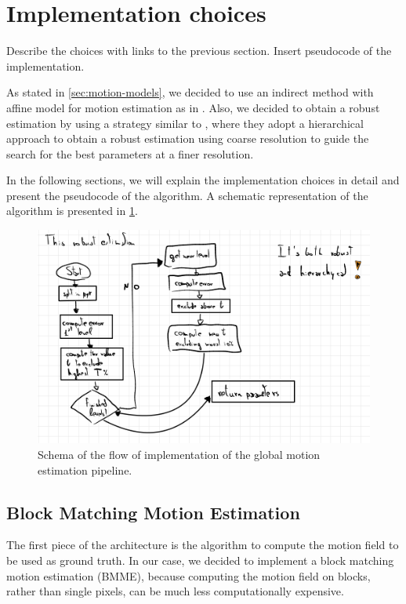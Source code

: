 \section{Implementation choices}
\label{sec:03-implementation}
Describe the choices with links to the previous section.
Insert pseudocode of the implementation.

As stated in \cref{sec:motion-models}, we decided to use an indirect method with affine model for motion estimation as in \cite{Bergen92}.
Also, we decided to obtain a robust estimation by using a strategy similar to \cite{Dufeaux2000}, where they adopt a hierarchical approach to obtain a robust estimation using coarse resolution to guide the search for the best parameters at a finer resolution.

In the following sections, we will explain the implementation choices in detail and present the pseudocode of the algorithm. A schematic representation of the algorithm is presented in \cref{fig:gme-schema}.

\begin{figure}
    \centering
    \includegraphics[width=.95\linewidth]{../assets/images/gme-schema.png}
    \caption{Schema of the flow of implementation of the global motion estimation pipeline.}
    \label{fig:gme-schema}
\end{figure}

\subsection{Block Matching Motion Estimation}
The first piece of the architecture is the algorithm to compute the motion field to be used as ground truth.
In our case, we decided to implement a block matching motion estimation (BMME), because computing the motion field on blocks, rather than single pixels, can be much less computationally expensive.

